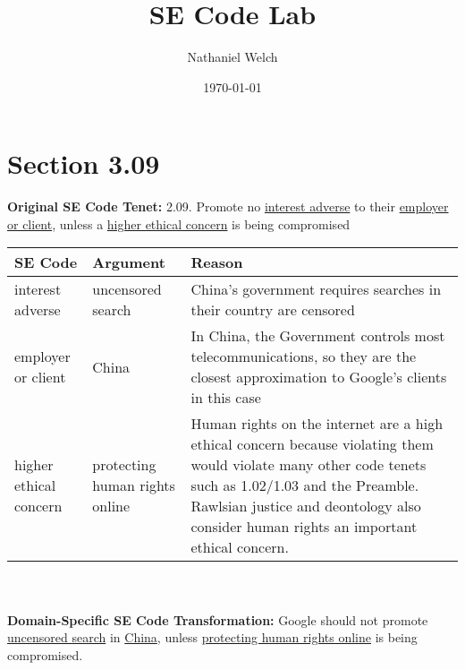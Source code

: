 \documentclass[]{article}
\title{SE Code Lab}
\author{Nathaniel Welch}
\date{\today}
\begin{document}
\ifpdf
{}
\else
{}
\fi

\maketitle

\section{Section 3.09}

\textbf{Original SE Code Tenet:}
2.09. Promote no \underline{interest adverse} to their \underline{employer or client}, unless a \underline{higher ethical concern} is
being compromised
\newline

\begin{tabular}{|p{100pt}|p{100pt}|p{220pt}|}
\hline
SE Code & Argument & Reason\\
\hline
interest adverse & uncensored search & China's government requires searches in their country are censored\\
\hline
employer or client & China & In China, the Government controls most telecommunications, so they are the closest approximation to Google's clients in this case\\
\hline
higher ethical concern & protecting human rights online & Human rights on the internet are a high ethical concern because violating them would violate many other code tenets such as 1.02/1.03 and the Preamble. Rawlsian justice and deontology also consider human rights an important ethical concern.\\
\hline
\end{tabular}\\
\newline\\
\textbf{Domain-Specific SE Code Transformation:}
Google should not promote \underline{uncensored search} in \underline{China}, unless \underline{protecting human rights online} is
being compromised.



\end{document}
